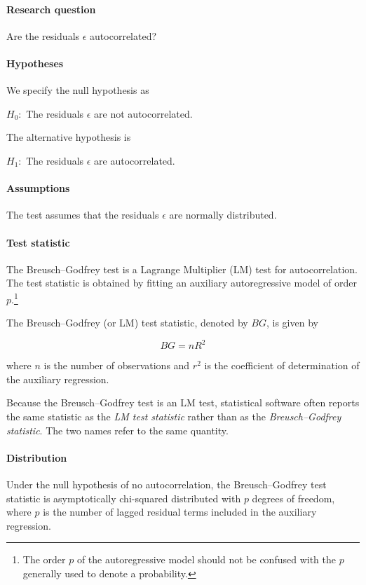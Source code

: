 \paragraph{Research question} Are the residuals $\epsilon$ autocorrelated?


\paragraph{Hypotheses} We specify the null hypothesis as


$H_0 : $ The residuals $\epsilon$ are not autocorrelated.

\bigskip
\noindent The alternative hypothesis is

$H_1 : $ The residuals $\epsilon$ are autocorrelated.


\paragraph{Assumptions} The test assumes that the residuals $\epsilon$ are normally distributed.

\paragraph{Test statistic} The Breusch--Godfrey test is a Lagrange Multiplier (LM) test for autocorrelation.
The test statistic is obtained by fitting an auxiliary autoregressive model of order $p$.\footnote{The order $p$ of the autoregressive model should not be confused with the $p$ generally used to denote a probability.}

The Breusch--Godfrey (or LM) test statistic, denoted by $BG$, is given by

\begin{equation}
BG = nR^2
\end{equation}

where $n$ is the number of observations and $r^2$ is the coefficient of determination of the auxiliary regression.

Because the Breusch--Godfrey test is an LM test, statistical software often reports the same statistic as the \emph{LM test statistic} rather than as the \emph{Breusch--Godfrey statistic}. The two names refer to the same quantity.

\paragraph{Distribution} Under the null hypothesis of no autocorrelation, the Breusch--Godfrey test statistic is asymptotically chi-squared distributed with $p$ degrees of freedom, where $p$ is the number of lagged residual terms included in the auxiliary regression.

